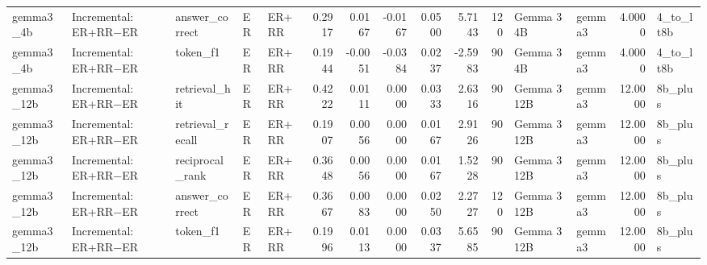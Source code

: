 \begin{tabular}{lllllrrrrrrllrl}
gemma3_4b & Incremental: ER+RR−ER & answer_correct & ER & ER+RR & 0.2917 & 0.0167 & -0.0167 & 0.0500 & 5.7143 & 120 & Gemma 3 4B & gemma3 & 4.0000 & 4_to_lt8b \\
gemma3_4b & Incremental: ER+RR−ER & token_f1 & ER & ER+RR & 0.1944 & -0.0051 & -0.0384 & 0.0237 & -2.5983 & 90 & Gemma 3 4B & gemma3 & 4.0000 & 4_to_lt8b \\
gemma3_12b & Incremental: ER+RR−ER & retrieval_hit & ER & ER+RR & 0.4222 & 0.0111 & 0.0000 & 0.0333 & 2.6316 & 90 & Gemma 3 12B & gemma3 & 12.0000 & 8b_plus \\
gemma3_12b & Incremental: ER+RR−ER & retrieval_recall & ER & ER+RR & 0.1907 & 0.0056 & 0.0000 & 0.0167 & 2.9126 & 90 & Gemma 3 12B & gemma3 & 12.0000 & 8b_plus \\
gemma3_12b & Incremental: ER+RR−ER & reciprocal_rank & ER & ER+RR & 0.3648 & 0.0056 & 0.0000 & 0.0167 & 1.5228 & 90 & Gemma 3 12B & gemma3 & 12.0000 & 8b_plus \\
gemma3_12b & Incremental: ER+RR−ER & answer_correct & ER & ER+RR & 0.3667 & 0.0083 & 0.0000 & 0.0250 & 2.2727 & 120 & Gemma 3 12B & gemma3 & 12.0000 & 8b_plus \\
gemma3_12b & Incremental: ER+RR−ER & token_f1 & ER & ER+RR & 0.1996 & 0.0113 & 0.0000 & 0.0337 & 5.6585 & 90 & Gemma 3 12B & gemma3 & 12.0000 & 8b_plus \\
\bottomrule
\end{tabular}
